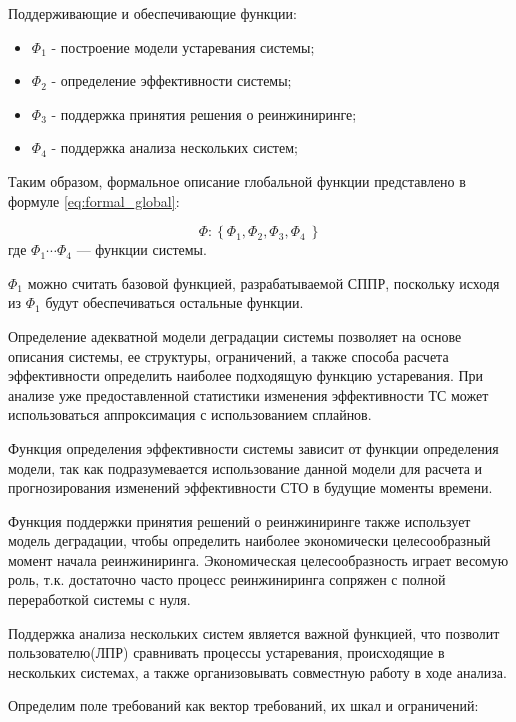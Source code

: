 Поддерживающие и обеспечивающие функции:
\begin{itemize}
    \item $\Phi_1$ - построение модели устаревания системы;
    \item $\Phi_2$ - определение эффективности системы;
    \item $\Phi_3$ - поддержка принятия решения о реинжиниринге;
    \item $\Phi_4$ - поддержка анализа нескольких систем;
\end{itemize}

Таким образом, формальное описание глобальной функции представлено в формуле \ref{eq:formal_global}:

\begin{equation}
    \label{eq:formal_global}
    \Phi: \left\{ \Phi_1, \Phi_2,\Phi_3,\Phi_4\ \right\}
\end{equation}
\vspace{\baselineskip}
где $\Phi_1 \cdots \Phi_4 $ --- функции системы.

$\Phi_1$ можно считать базовой функцией, разрабатываемой СППР, поскольку исходя из $\Phi_1$ будут обеспечиваться остальные функции.

Определение адекватной модели деградации системы позволяет на основе описания системы, ее структуры, ограничений, а также способа расчета эффективности определить наиболее подходящую функцию устаревания. 
При анализе уже предоставленной статистики изменения эффективности ТС может использоваться аппроксимация с использованием сплайнов.

Функция определения эффективности системы зависит от функции определения модели, так как подразумевается использование данной модели для расчета и прогнозирования изменений эффективности СТО в будущие моменты времени.

Функция поддержки принятия решений о реинжиниринге также использует модель деградации, чтобы определить наиболее экономически целесообразный момент начала реинжиниринга. 
Экономическая целесообразность играет весомую роль, т.к. достаточно часто процесс реинжиниринга сопряжен с полной переработкой системы с нуля.

Поддержка анализа нескольких систем является важной функцией, что позволит пользователю(ЛПР) сравнивать процессы устаревания, происходящие в нескольких системах, а также организовывать совместную работу в ходе анализа.

Определим поле требований как вектор требований, их шкал и ограничений: 

